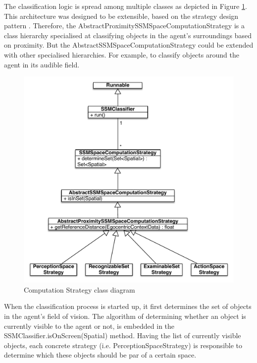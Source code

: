 The classification logic is spread among multiple classes as depicted in Figure \ref{fig:impl_computation_strategy}. This architecture was designed to be extensible, based on the strategy design pattern \cite{gamma1994design}. Therefore, the AbstractProximitySSMSpaceComputationStrategy is a class hierarchy specialised at classifying objects in the agent's surroundings based on proximity. But the AbstractSSMSpaceComputationStrategy could be extended with other specialised hierarchies. For example, to classify objects around the agent in its audible field.
\begin{figure}[H]
	\centering
	\includegraphics[width=\linewidth]{gfx/Chapter4/computation_strategy}
	\caption{Computation Strategy class diagram}
	\label{fig:impl_computation_strategy}
\end{figure}

When the classification process is started up, it first determines the set of objects in the agent's field of vision. The algorithm of determining whether an object is currently visible to the agent or not, is embedded in the SSMClassifier.isOnScreen(Spatial) method. Having the list of currently visible objects, each concrete strategy (i.e. PerceptionSpaceStrategy) is responsible to determine which these objects should be par of a certain space.\\

